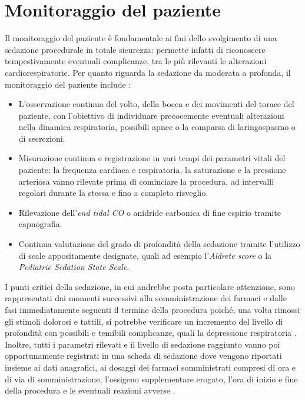 \section{Monitoraggio del paziente}

Il monitoraggio del paziente è fondamentale ai fini dello svolgimento di una sedazione procedurale in totale sicurezza: permette infatti di riconoscere tempestivamente eventuali complicanze, tra le più rilevanti le alterazioni cardiorespiratorie. 
Per quanto riguarda la sedazione da moderata a profonda, il monitoraggio del paziente include \cite{Krauss2006, Simeupsedazione}: 

\begin{itemize}
    \item L'osservazione continua del volto, della bocca e dei movimenti del torace del paziente, con l'obiettivo di individuare precocemente eventuali alterazioni nella dinamica respiratoria, possibili apnee o la comparsa di laringospasmo o di secrezioni.
    \item Misurazione continua e registrazione in vari tempi dei parametri vitali del paziente: la frequenza cardiaca e respiratoria, la saturazione e la pressione arteriosa vanno rilevate prima di cominciare la procedura, ad intervalli regolari durante la stessa e fino a completo risveglio. 
    \item Rilevazione dell'\emph{end tidal CO} o anidride carbonica di fine espirio tramite capnografia.
    \item Continua valutazione del grado di profondità della sedazione tramite l'utilizzo di scale appositamente designate, quali ad esempio l'\emph{Aldrete score} o la \emph{Pediatric Sedation State Scale}.
\end{itemize} 

I punti critici della sedazione, in cui andrebbe posta particolare attenzione, sono rappresentati dai momenti successivi alla somministrazione dei farmaci e dalle fasi immediatamente seguenti il termine della procedura poiché, una volta rimossi gli stimoli dolorosi e tattili, si potrebbe verificare un incremento del livello di profondità con possibili e temibili complicanze, quali la depressione respiratoria \cite{Daud2014}. 
\\Inoltre, tutti i parametri rilevati e il livello di sedazione raggiunto vanno poi opportunamente registrati in una scheda di sedazione dove vengono riportati insieme ai dati anagrafici, ai dosaggi dei farmaci somministrati compresi di ora e di via di somministrazione, l'ossigeno supplementare erogato, l'ora di inizio e fine della procedura e le eventuali reazioni avverse \cite{Guidelines2019, Simeupsedazione}. 


